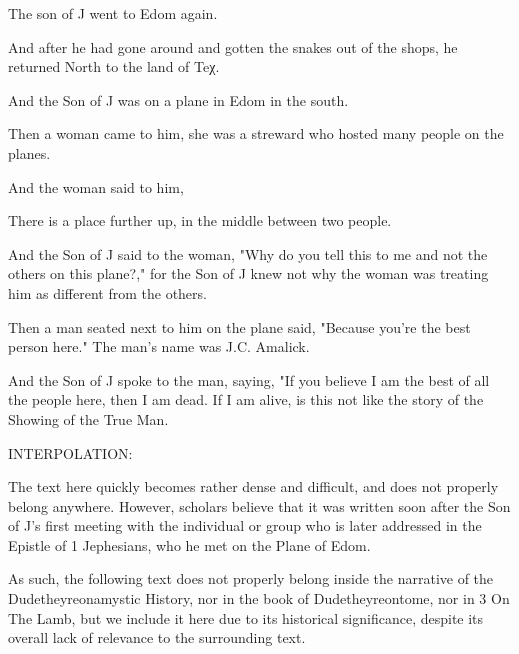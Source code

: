 
\Sentence
{ \hX{} }
{ \eX{} }
{
The son of J went to Edom again.
}

\Sentence
{ \hX{} }
{ \eX{} }
{
And after he had gone around and gotten the snakes out of the shops, he returned North to the land of Teχ.
}

\Sentence
{ \hX{} }
{ \eX{} }
{
And the Son of J was on a plane in Edom in the south.
}

\Sentence
{ \hX{} }
{ \eX{} }
{
Then a woman came to him, she was a streward who hosted many people on the planes.
}

\Sentence
{ \hX{} }
{ \eX{} }
{
And the woman said to him,
}

\Sentence
{ \hX{} }
{ \eX{} }
{
There is a place further up, in the middle between two people.
}

\Sentence
{ \hX{} }
{ \eX{} }
{
And the Son of J said to the woman, "Why do you tell this to me and not the others on this plane?," for the Son of J knew not why the woman was treating him as different from the others.
}

\Sentence
{ \hX{} }
{ \eX{} }
{
Then a man seated next to him on the plane said, "Because you're the best person here." The man's name was J.C. Amalick.
}

\Sentence
{ \hX{} }
{ \eX{} }
{
And the Son of J spoke to the man, saying, "If you believe I am the best of all the people here, then I am dead. If I am alive, is this not like the story of the Showing of the True Man.
}

\Sentence
{ \hX{} }
{ \eX{} }
{
INTERPOLATION:
}

\Sentence
{ \hX{} }
{ \eX{} }
{
The text here quickly becomes rather dense and difficult, and does not properly belong anywhere. However, scholars believe that it was written soon after the Son of J's first meeting with the individual or group who is later addressed in the Epistle of 1 Jephesians, who he met on the Plane of Edom.
}

\Sentence
{ \hX{} }
{ \eX{} }
{
As such, the following text does not properly belong inside the narrative of the Dudetheyreonamystic History, nor in the book of Dudetheyreontome, nor in 3 On The Lamb, but we include it here due to its historical significance, despite its overall lack of relevance to the surrounding text.
}


